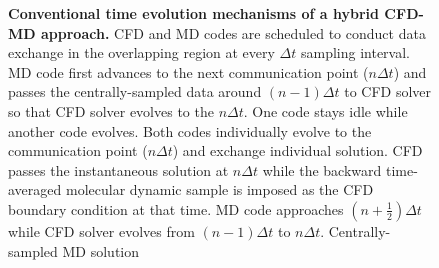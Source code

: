 \documentclass[preprint,12pt]{elsarticle}
\begin{document}
\begin{figure}
\centering
{}
\vskip-0.2cm
\caption[]{\small {\bf Conventional time evolution mechanisms of a hybrid CFD-MD approach.} 
CFD and MD codes are scheduled to conduct data exchange in the overlapping 
region at every $\Delta{t}$ sampling interval.
 MD code first advances to the next communication
point ($n{\Delta}t$) and passes the centrally-sampled data around
$(n-1){\Delta}t$ to CFD solver so that CFD solver evolves to the $n{\Delta}t$.
One code stays idle while another code evolves.
 Both codes individually evolve to the communication
point ($n{\Delta}t$) and exchange individual solution.
CFD passes the instantaneous solution at $n{\Delta}t$ while
the backward time-averaged molecular dynamic sample is imposed as the
CFD boundary condition at that time.
 MD code approaches $(n+\frac{1}{2}){\Delta}t$ while
CFD solver evolves from $(n-1){\Delta}t$ to $n{\Delta}t$. Centrally-sampled MD solution
}
\end{figure}
\end{document}
